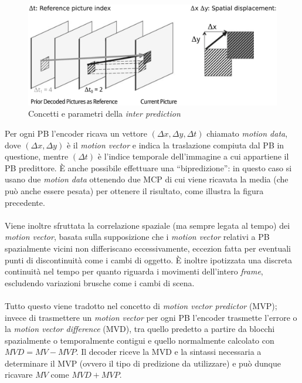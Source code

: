 \begin{figure}[H]
  \centering
  \captionsetup{justification=raggedright}
  \includegraphics[scale=0.3]{Figures/Inter_pred}
  \caption{Concetti e parametri della \emph{inter prediction}}
\end{figure}

Per ogni PB l'encoder ricava un vettore ${(\Delta x,\Delta y,\Delta t)}$ 
chiamato \emph{motion data}, dove ${(\Delta x,\Delta y)}$ è il 
\emph{motion vector} e indica la traslazione compiuta dal PB in questione, 
mentre ${(\Delta t)}$ è l'indice temporale dell'immagine a cui appartiene il PB 
predittore.
È anche possibile effettuare una ``bipredizione'': in questo caso si usano 
due \emph{motion data} ottenendo due MCP di cui viene ricavata la media (che 
può anche essere pesata) per ottenere il risultato, come illustra la figura 
precedente.
\\ \\
Viene inoltre sfruttata la correlazione spaziale (ma sempre legata al tempo) 
dei \emph{motion vector}, basata sulla supposizione che i \emph{motion vector} 
relativi a PB spazialmente vicini non differiscano eccessivamente, eccezion 
fatta per eventuali punti di discontinuità come i cambi di oggetto. È inoltre 
ipotizzata una discreta continuità nel tempo per quanto riguarda i movimenti 
dell'intero \emph{frame}, escludendo variazioni brusche come i cambi di scena.
\\ \\
Tutto questo viene tradotto nel concetto di \emph{motion vector predictor} 
(MVP); invece di trasmettere un \emph{motion vector} per ogni PB l'encoder 
trasmette l'errore o la \emph{motion vector difference} (MVD), tra quello 
predetto a partire da blocchi spazialmente o temporalmente contigui e quello 
normalmente calcolato con $MVD=MV-MVP$.
Il decoder riceve la MVD e la sintassi necessaria a determinare il MVP (ovvero 
il tipo di predizione da utilizzare) e può dunque ricavare $MV$ come $MVD+MVP$.
 

